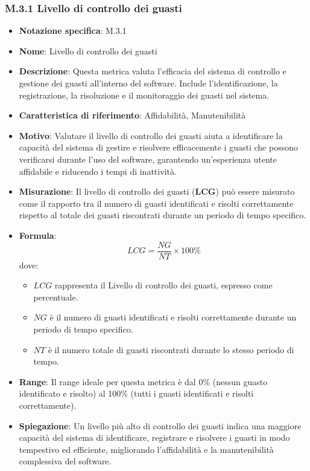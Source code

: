 \subsubsection{M.3.1 Livello di controllo dei guasti}
\begin{itemize}
    \item \textbf{Notazione specifica}: M.3.1
    \item \textbf{Nome}: Livello di controllo dei guasti
    \item \textbf{Descrizione}: Questa metrica valuta l'efficacia del sistema di controllo e gestione dei guasti all'interno del software. Include l'identificazione, la registrazione, la risoluzione e il monitoraggio dei guasti nel sistema.
    \item \textbf{Caratteristica di riferimento}: Affidabilità, Manutenibilità
    \item \textbf{Motivo}: Valutare il livello di controllo dei guasti aiuta a identificare la capacità del sistema di gestire e risolvere efficacemente i guasti che possono verificarsi durante l'uso del software, garantendo un'esperienza utente affidabile e riducendo i tempi di inattività.
    \item \textbf{Misurazione}: Il livello di controllo dei guasti (\textbf{LCG}) può essere misurato come il rapporto tra il numero di guasti identificati e risolti correttamente rispetto al totale dei guasti riscontrati durante un periodo di tempo specifico.
    \item \textbf{Formula}:
    \[ LCG = \frac{NG}{NT} \times 100\% \]
    dove:
    \begin{itemize}
        \item \( LCG \) rappresenta il Livello di controllo dei guasti, espresso come percentuale.
        \item \( NG \) è il numero di guasti identificati e risolti correttamente durante un periodo di tempo specifico.
        \item \( NT \) è il numero totale di guasti riscontrati durante lo stesso periodo di tempo.
    \end{itemize}
    \item \textbf{Range}: Il range ideale per questa metrica è dal 0\% (nessun guasto identificato e risolto) al 100\% (tutti i guasti identificati e risolti correttamente).
    \item \textbf{Spiegazione}: Un livello più alto di controllo dei guasti indica una maggiore capacità del sistema di identificare, registrare e risolvere i guasti in modo tempestivo ed efficiente, migliorando l'affidabilità e la manutenibilità complessiva del software.
\end{itemize}
